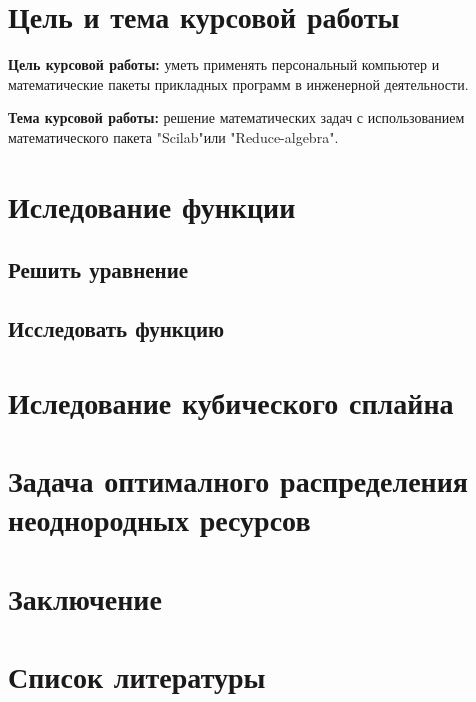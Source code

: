 \documentclass[russian,utf8]{eskdtext}
\begin{document}
\maketitle
\tableofcontents


\newpage
\section{Цель и тема курсовой работы}
 \textbf{Цель курсовой работы:} уметь применять персональный компьютер и
математические пакеты прикладных программ в инженерной деятельности.
 
 \textbf{Тема курсовой работы:} решение математических задач с использованием
математического пакета "Scilab"или "Reduce-algebra".

\newpage
\section{Иследование функции}

\subsection{Решить уравнение}

\subsection{Исследовать функцию}

\newpage
\section{Иследование кубического сплайна}

\newpage
\section{Задача оптималного распределения неоднородных ресурсов}

\newpage
\section{Заключение}

\newpage
\section{Список литературы}
\end{document}
